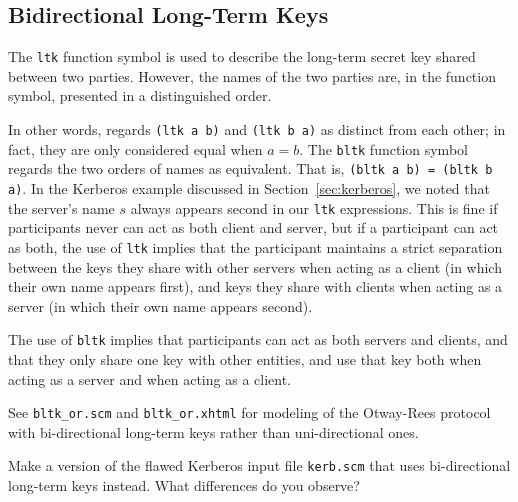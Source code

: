\subsection{Bidirectional Long-Term Keys}
\label{sec:bltk}
The \texttt{ltk} function symbol is used to describe the long-term secret
key shared between two parties.  However, the names of the two parties
are, in the function symbol, presented in a distinguished order.

In other words, {\cpsa} regards \texttt{(ltk a b)} and \texttt{(ltk b
  a)} as distinct from each other; in fact, they are only considered
equal when $a = b$. The \texttt{bltk} function
symbol %
regards the two orders of names as equivalent. That is, \texttt{(bltk
  a b) = (bltk b a)}.  In the Kerberos example discussed in
Section~\ref{sec:kerberos}, we noted that the server's name $s$ always
appears second in our \texttt{ltk} expressions.  This is fine if
participants never can act as both client and server, but if a
participant can act as both, the use of \texttt{ltk} implies that the
participant maintains a strict separation between the keys they share
with other servers when acting as a client (in which their own name
appears first), and keys they share with clients when acting as a
server (in which their own name appears second).

The use of \texttt{bltk} implies that participants can act as both
servers and clients, and that they only share one key with other
entities, and use that key both when acting as a server and when
acting as a client.

 See
\texttt{bltk\_or.scm} and \texttt{bltk\_or.xhtml} for modeling of the
Otway-Rees protocol with bi-directional long-term keys rather than
uni-directional ones.

\begin{exercise}
\label{ex:bltk_kerb}
Make a version of the flawed Kerberos input file \texttt{kerb.scm}
that uses bi-directional long-term keys instead.  What differences do
you observe?
\end{exercise}

